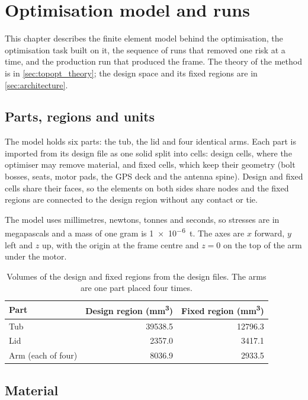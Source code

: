 \chapter{Optimisation model and runs}\label{sec:optimisation_model}

This chapter describes the finite element model behind the optimisation, the optimisation task built on it, the sequence of runs that removed one risk at a time, and the production run that produced the frame. The theory of the method is in \cref{sec:topopt_theory}; the design space and its fixed regions are in \cref{sec:architecture}.

\section{Parts, regions and units}\label{sec:optimisation_model-parts}

The model holds six parts: the tub, the lid and four identical arms. Each part is imported from its design file as one solid split into cells: design cells, where the optimiser may remove material, and fixed cells, which keep their geometry (bolt bosses, seats, motor pads, the GPS deck and the antenna spine). Design and fixed cells share their faces, so the elements on both sides share nodes and the fixed regions are connected to the design region without any contact or tie.

The model uses millimetres, newtons, tonnes and seconds, so stresses are in megapascals and a mass of one gram is \SI{1e-6}{t}. The axes are $x$ forward, $y$ left and $z$ up, with the origin at the frame centre and $z = 0$ on the top of the arm under the motor.

\begin{table}[htbp]
\centering\small
\caption{Volumes of the design and fixed regions from the design files. The arms are one part placed four times.}\label{tab:optimisation_model-volumes}
\begin{tabular}{@{}lrr@{}}
\toprule
Part & Design region (\si{mm^3}) & Fixed region (\si{mm^3})\\
\midrule
Tub & \num{39538.5} & \num{12796.3}\\
Lid & \num{2357.0} & \num{3417.1}\\
Arm (each of four) & \num{8036.9} & \num{2933.5}\\
\bottomrule
\end{tabular}
\end{table}

\section{Material}\label{sec:optimisation_model-material}

